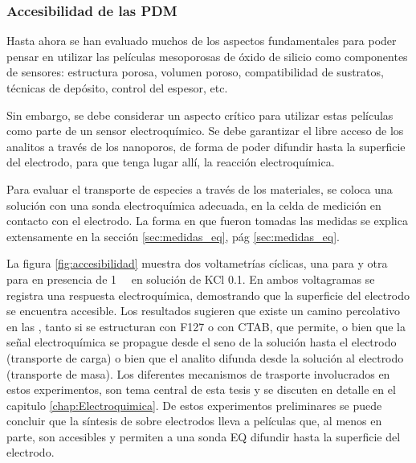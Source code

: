 	      \subsubsection{Accesibilidad de las PDM}\label{sec:acc}

			Hasta ahora se han evaluado muchos de los aspectos fundamentales para poder pensar en utilizar las películas mesoporosas de óxido de silicio como componentes de sensores: estructura porosa, volumen poroso, compatibilidad de sustratos, técnicas de depósito, control del espesor, etc. 

			Sin embargo, se debe considerar un aspecto crítico para utilizar estas películas como parte de un sensor electroquímico. Se debe garantizar el libre acceso de los analitos a través de los nanoporos, de forma de poder difundir hasta la superficie del electrodo, para que tenga lugar allí, la reacción electroquímica.

			Para evaluar el transporte de especies a través de los materiales, se coloca una solución con una sonda electroquímica adecuada, en la celda de medición en contacto con el electrodo. La forma en que fueron tomadas las medidas se explica extensamente en la sección \ref{sec:medidas_eq}, pág \ref{sec:medidas_eq}. 

			La figura \ref{fig:accesibilidad} muestra dos voltametrías cíclicas, una para \pdmF\space y otra para \pdmC\space en presencia de \aminorutenio\space \SI{1}{\milli\Molar} en solución de KCl \SI{0.1}{\Molar}. En ambos voltagramas se registra una respuesta electroquímica, demostrando que la superficie del electrodo se encuentra accesible. Los resultados sugieren que existe un camino percolativo en las \pdm, tanto si se estructuran con F127 o con CTAB, que permite, o bien que la señal electroquímica se propague desde el seno de la solución hasta el electrodo (transporte de carga) o bien que el analito difunda desde la solución al electrodo (transporte de masa). Los diferentes mecanismos de trasporte involucrados en estos experimentos, son tema central de esta tesis y se discuten en detalle en el capitulo \ref{chap:Electroquimica}. De estos experimentos preliminares se puede concluir que la síntesis de \pdm\space sobre electrodos lleva a películas que, al menos en parte, son accesibles y permiten a una sonda EQ difundir hasta la superficie del electrodo.   

